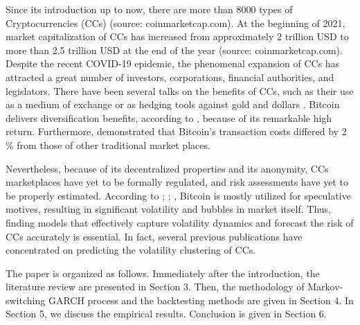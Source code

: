 \documentclass[12pt,a4paper]{article}
\begin{document}
Since its introduction up to now, there are more than 8000 types of Cryptocurrencies (CCs) (source: coinmarketcap.com). At the beginning of 2021, market capitalization of CCs has increased from approximately 2 trillion USD to more than 2.5 trillion USD at the end of the year (source: coinmarketcap.com). Despite the recent COVID-19 epidemic, the phenomenal expansion of CCs has attracted a great number of investors, corporations, financial authorities, and legislators. There have been several talks on the benefits of CCs, such as their use as a medium of exchange or as hedging tools against gold and dollars \citep{dyhrberg2016bitcoin}. Bitcoin delivers diversification benefits, according to \cite{corbet2018exploring}, because of its remarkable high return. Furthermore, \cite{kim2017transaction} demonstrated that Bitcoin's transaction costs differed by 2$\%$ from those of other traditional market places. \par

Nevertheless, because of its decentralized properties and its anonymity, CCs marketplaces have yet to be formally regulated, and risk assessments have yet to be properly estimated. According to \cite{corbet2018exploring}; \cite{baur2018bitcoin}; \cite{fry2018booms}, Bitcoin is mostly utilized for speculative motives, resulting in significant volatility and bubbles in market itself. Thus, finding models that effectively capture volatility dynamics and forecast the risk of CCs accurately is essential. In fact, several previous publications have concentrated on predicting the volatility clustering of CCs.\par

The paper is organized as follows. Immediately after the introduction, the literature review are presented in Section 3. Then, the methodology of Markov-switching GARCH process and the backtesting methods are given in Section 4. In Section 5, we discuss the empirical results. Conclusion is given in Section 6.\par  
      
\end{document}
